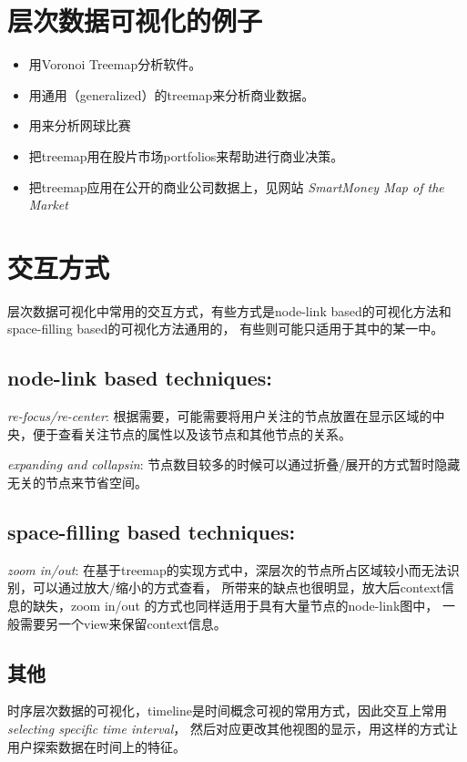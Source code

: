 \documentclass{article}
\begin{document}
\section{层次数据可视化的例子}
\begin{itemize}
	\item \cite{balzer2005voronoi}用Voronoi Treemap\cite{Balzer_voronoitreemaps}分析软件。
	\item \cite{vliegen2006visualizing}用通用（generalized）的treemap来分析商业数据。
	\item \cite{jin1997tennisviewer}用来分析网球比赛
	\item \cite{jungmeister1992adapting}把treemap用在股片市场portfolios来帮助进行商业决策。
	\item \cite{wattenberg1999visualizing}把treemap应用在公开的商业公司数据上，见网站
		\emph{SmartMoney Map of the Market}
\end{itemize}

\section{交互方式}
层次数据可视化中常用的交互方式，有些方式是node-link based的可视化方法和space-filling based的可视化方法通用的，
有些则可能只适用于其中的某一中。
\subsection{node-link based techniques:}

\emph{re-focus/re-center}: 根据需要，可能需要将用户关注的节点放置在显示区域的中央，便于查看关注节点的属性以及该节点和其他节点的关系。

\emph{expanding and collapsin}: 节点数目较多的时候可以通过折叠/展开的方式暂时隐藏无关的节点来节省空间。

\subsection{space-filling based techniques:}

\emph{zoom in/out}: 在基于treemap的实现方式中，深层次的节点所占区域较小而无法识别，可以通过放大/缩小的方式查看，
所带来的缺点也很明显，放大后context信息的缺失，zoom in/out 的方式也同样适用于具有大量节点的node-link图中，
一般需要另一个view来保留context信息。

\subsection{其他}
时序层次数据的可视化，timeline是时间概念可视的常用方式，因此交互上常用\emph{selecting specific time interval}，
然后对应更改其他视图的显示，用这样的方式让用户探索数据在时间上的特征。
\end{document}
